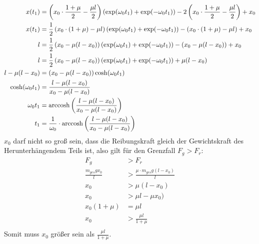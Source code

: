 \documentclass[sectionformat = exercise]{gadsescript}
\begin{document}
\begin{align*}
	x(t_1) &= \left(x_0 \cdot \frac{ 1 + \mu }{ 2 } - \frac{\mu l}{ 2 }\right) \left( \exp(\omega_0 t_1) + \exp(-\omega_0 t_1) \right) - 2\left(x_0 \cdot \frac{ 1 + \mu }{ 2 } - \frac{\mu l}{ 2 }\right) + x_0\\
	x(t_1) &= \frac{ 1 }{ 2 } \left(x_0 \cdot (1 + \mu ) - \mu l\right) \left( \exp(\omega_0 t_1) + \exp(-\omega_0 t_1) \right) - \left(x_0 \cdot ( 1 + \mu ) - \mu l\right) + x_0\\
	l &= \frac{ 1 }{ 2 } \left(x_0 - \mu (l - x_0) \right) \left( \exp(\omega_0 t_1) + \exp(-\omega_0 t_1) \right) - \left(x_0 - \mu (l - x_0)\right) + x_0\\
	l &= \frac{ 1 }{ 2 } \left(x_0 - \mu (l - x_0) \right) \left( \exp(\omega_0 t_1) + \exp(-\omega_0 t_1) \right) + \mu (l - x_0)\\
	l - \mu (l - x_0) &= \left(x_0 - \mu (l - x_0) \right) \cosh(\omega_0 t_1) \\
	\cosh(\omega_0 t_1) &= \frac{l - \mu (l - x_0) }{ x_0 - \mu (l - x_0) } \\
	\omega_0 t_1 &= \operatorname{arccosh}\left(\frac{l - \mu (l - x_0) }{ x_0 - \mu (l - x_0) }\right) \\
	t_1 &= \frac{ 1 }{ \omega_0 } \cdot \operatorname{arccosh}\left(\frac{l - \mu (l - x_0) }{ x_0 - \mu (l - x_0) }\right) \\
\end{align*}
$ x_0 $ darf nicht so groß sein, dass die Reibungskraft gleich der Gewichtskraft des Herunterhängendem Teils ist, also gilt für den Grenzfall $ F_g > F_r $:
\begin{align*}
	F_g &> F_r \\
	\frac{ m_{ges} g x_0 }{ l } &> \frac{\mu \cdot m_{ges} g ( l - x_0 )}{ l } \\
	x_0 &> \mu ( l - x_0 ) \\
	x_0 &> \mu l - \mu x_0 ) \\
	x_0 ( 1 + \mu) &= \mu l \\
	x_0 &> \frac{\mu l}{ 1 + \mu }  \\
\end{align*}
Somit muss $ x_0 $ größer sein als $ \frac{\mu l}{ 1 + \mu } $.
\end{document}
